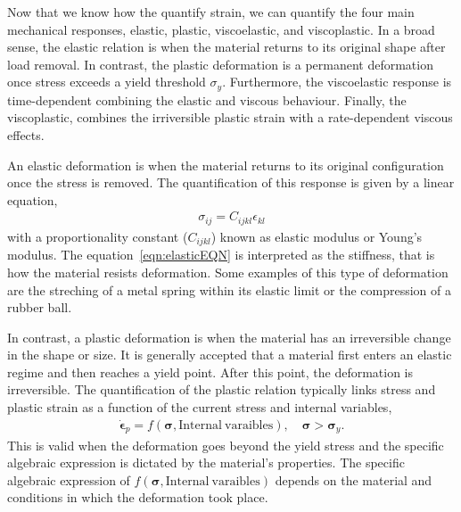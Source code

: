Now that we know how the quantify strain, we can quantify the four main mechanical responses,
    elastic,
    plastic,
    viscoelastic,
    and viscoplastic.
In a broad sense, the elastic relation is when the material returns to its original shape after load removal.
In contrast, the plastic deformation is a permanent deformation once stress exceeds a yield threshold $\sigma_y$.
Furthermore, the viscoelastic response is time-dependent combining the elastic and viscous behaviour.
Finally, the viscoplastic, combines the irriversible plastic strain with a rate-dependent viscous effects.

An elastic deformation is when the material returns to its original configuration once the stress is removed.
The quantification of this response is given by a linear equation,
\begin{gather}
    \sigma_{ij} = C_{ijkl}\epsilon_{kl}\label{eqn:elasticEQN}
\end{gather}
with a proportionality constant ($C_{ijkl}$) known as elastic modulus or Young's modulus.
The equation~\eqref{eqn:elasticEQN} is interpreted as the stiffness, that is how the material resists deformation.
Some examples of this type of deformation are the streching of a metal spring within its elastic limit or the compression of a rubber ball.


In contrast, a plastic deformation is when the material has an irreversible change in the shape or size.
It is generally accepted that a material first enters an elastic regime and then reaches a yield point. 
After this point, the deformation is irreversible.
The quantification of the plastic relation typically links stress and plastic strain as a function of the current stress and internal variables,
\begin{gather}
    \dot{\bm{\epsilon}}_{p} = f\left(\bm{\sigma},\mathrm{Internal~varaibles}\right),\quad\bm{\sigma}>\bm{\sigma}_{y}\label{eqn:plasticEQN}.
\end{gather}
This is valid when the deformation goes beyond the yield stress and the specific algebraic expression is dictated by the material's properties.
The specific algebraic expression of $f\left(\bm{\sigma},\mathrm{Internal~varaibles}\right)$ depends on the material and conditions in which the deformation took place.

